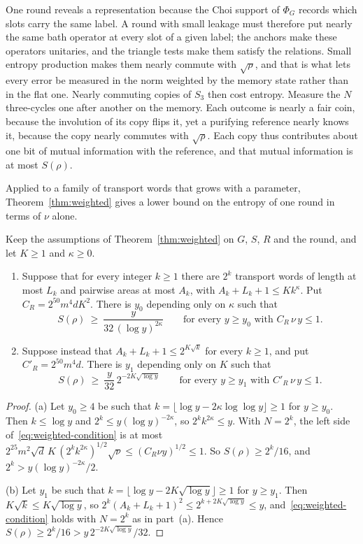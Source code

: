 One round reveals a representation because the Choi support of $\Phi_G$ records which slots carry the same label. A round with small leakage
must therefore put nearly the same bath operator at every slot of a given label; the anchors make these operators unitaries, and the
triangle tests make them satisfy the relations. Small entropy production makes them nearly commute with $\sqrt\rho$, and that is what lets
every error be measured in the norm weighted by the memory state rather than in the flat one. Nearly commuting copies of $S_3$ then cost
entropy. Measure the $N$ three-cycles one after another on the memory. Each outcome is nearly a fair coin, because the involution of its copy
flips it, yet a purifying reference nearly knows it, because the copy nearly commutes with $\sqrt\rho$. Each copy thus contributes about one
bit of mutual information with the reference, and that mutual information is at most $S(\rho)$.

Applied to a family of transport words that grows with a parameter, Theorem~\ref{thm:weighted} gives a lower bound on the entropy of one round
in terms of $\nu$ alone.

\begin{corollary}[Amplification]\label{cor:amplification}
Keep the assumptions of Theorem~\ref{thm:weighted} on $G$, $S$, $R$ and the round, and let $K\ge1$ and $\kappa\ge0$.
\begin{enumerate}[label=(\alph*),itemsep=1pt]
\item Suppose that for every integer $k\ge1$ there are $2^k$ transport words of length at most $L_k$ and pairwise areas at most $A_k$, with
$A_k+L_k+1\le Kk^\kappa$. Put $C_R=2^{50}m^4dK^2$. There is $y_0$ depending only on $\kappa$ such that
\[
S(\rho)\ \ge\ \frac{y}{32\,(\log y)^{2\kappa}}\qquad\text{for every }y\ge y_0\text{ with }C_R\,\nu\,y\le1 .
\]
\item Suppose instead that $A_k+L_k+1\le2^{K\sqrt k}$ for every $k\ge1$, and put $C'_R=2^{50}m^4d$. There is $y_1$ depending only on $K$ such that
\[
S(\rho)\ \ge\ \frac{y}{32}\,2^{-2K\sqrt{\log y}}\qquad\text{for every }y\ge y_1\text{ with }C'_R\,\nu\,y\le1 .
\]
\end{enumerate}
\end{corollary}

\begin{proof}
(a) Let $y_0\ge4$ be such that $k=\lfloor\log y-2\kappa\log\log y\rfloor\ge1$ for $y\ge y_0$. Then $k\le\log y$ and $2^k\le y(\log y)^{-2\kappa}$, so
$2^kk^{2\kappa}\le y$. With $N=2^k$, the left side of~\eqref{eq:weighted-condition} is at most
$2^{25}m^2\sqrt d\,K\,(2^kk^{2\kappa})^{1/2}\sqrt\nu\le(C_R\nu y)^{1/2}\le1$. So $S(\rho)\ge2^k/16$, and $2^k>y(\log y)^{-2\kappa}/2$.

(b) Let $y_1$ be such that $k=\lfloor\log y-2K\sqrt{\log y}\rfloor\ge1$ for $y\ge y_1$. Then $K\sqrt k\le K\sqrt{\log y}$, so
$2^k(A_k+L_k+1)^2\le2^{k+2K\sqrt{\log y}}\le y$, and~\eqref{eq:weighted-condition} holds with $N=2^k$ as in part~(a). Hence
$S(\rho)\ge2^k/16>y\,2^{-2K\sqrt{\log y}}/32$.
\end{proof}
